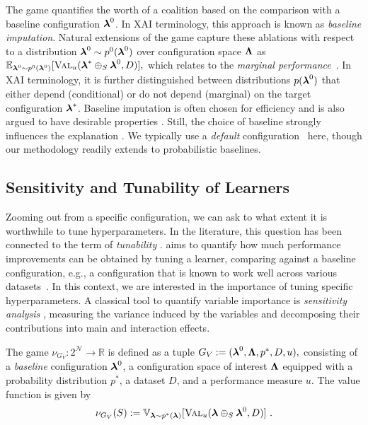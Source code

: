 \documentclass[letterpaper]{article} %
\begin{document}
The \ablation game quantifies the worth of a coalition based on the comparison with a baseline configuration $\boldsymbol{\lambda}^0$.
In XAI terminology, this approach is known as \emph{baseline imputation}. %
Natural extensions of the \ablation game capture these ablations with respect to a distribution $\boldsymbol{\lambda}^0 \sim p^0(\boldsymbol{\lambda}^0)$ over configuration space $\boldsymbol{\Lambda}$ as
$\mathbb{E}_{\boldsymbol{\lambda}^0 \sim p^0(\boldsymbol{\lambda}^0)}[ \textsc{Val}_u(\boldsymbol{\lambda}^\ast \oplus_S \boldsymbol{\lambda}^0, D)]
,$
which relates to the \emph{marginal performance}~\cite{fANOVA}.
In XAI terminology, it is further distinguished between distributions $p(\boldsymbol{\lambda}^0)$ that either depend (conditional) or do not depend (marginal) on the target configuration $\boldsymbol{\lambda}^\ast$.
Baseline imputation is often chosen for efficiency and is also argued to have desirable properties \citep{Sundararajan.2020b}.
Still, the choice of baseline strongly influences the explanation \citep{sturmfels2020visualizing}.
We typically use a \emph{default} configuration~\cite{AnastacioH20} here, though our methodology readily extends to probabilistic baselines.


\subsection{Sensitivity and Tunability of Learners}\label{sec:sensitivity-tunability}
Zooming out from a specific configuration, we can ask to what extent it is worthwhile to tune hyperparameters. 
In the literature, this question has been connected to the term of \textit{tunability} \citep{tunability}. 
\dstunability aims to quantify how much performance improvements can be obtained by tuning a learner, comparing against a baseline configuration, e.g., a configuration that is known to work well across various datasets~\citep{DBLP:conf/gecco/PushakH20a}.
In this context, we are interested in the importance of tuning specific hyperparameters.
A classical tool to quantify variable importance is \emph{sensitivity analysis} \citep{Owen_2013}, measuring the variance induced by the variables and decomposing their contributions into main and interaction effects.

\begin{definition}
The \sensitivity game $\nu_{G_V}: 2^{\mathcal N} \to \mathbb{R}$ is defined as a tuple $G_V := (\boldsymbol{\lambda}^0, \boldsymbol{\Lambda}, p^*, D, u),$
consisting of a \emph{baseline} configuration $\boldsymbol{\lambda}^0$, a configuration space of interest $\boldsymbol{\Lambda}$ equipped with a probability distribution $p^*$, a dataset $D$, and a performance measure $u$. 
The value function is given by
\[
    \nu_{G_V}(S) := \mathbb{V}_{\boldsymbol{\lambda} \sim p^\ast(\boldsymbol{\lambda})}[\textsc{Val}_u(\boldsymbol{\lambda} \oplus_S \boldsymbol{\lambda}^0, D)] \,\, .
\] 
\end{definition}
\end{document}
